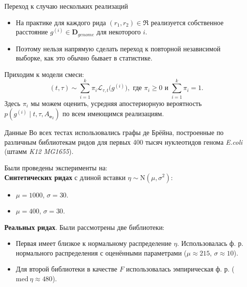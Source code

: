 \documentclass[unicode, notheorems]{beamer}
\begin{document}
\begin{frame}{Переход к случаю нескольких реализаций}
	\begin{itemize}
		\item На практике для каждого рида  $(r_1, r_2) \in \mathfrak{R}$ реализуется собственное расстояние $g^{(i)} \in \mathbf{D}_{genome}$ для некоторого $i$.
		\item Поэтому нельзя напрямую сделать переход к повторной независимой выборке, как это обычно бывает в статистике.
	\end{itemize}
	\medskip
	Приходим к {\color{blue} модели смеси}:
	\begin{equation*}
		(t, \tau) \sim \sum_{i=1}^k \pi_i  \mathcal{L}_{\tau, t} \big(g^{(i)}\big), \text{ где } \pi_i \ge 0 \text{ и } \sum_{i=1}^k \pi_i = 1.
	\end{equation*}
	Здесь $\pi_i$ мы можем оценить, усредняя апостериорную вероятность $p(g^{(i)} \mid t, \tau, A_{\mathbf{e}_2})$ по всем имеющимся реализациям.
\end{frame}

\begin{frame}{Данные}			
		Во всех тестах использовались графы де Брёйна, построенные по различным библиотекам ридов для первых 400 тысяч нуклеотидов генома \textit{E.coli} (штамм \textit{K12 MG1655}).
		\medskip
		
		Были проведены эксперименты на:\\
		\smallskip
		\textbf{Синтетических ридах} с длиной вставки $\eta \sim \mathrm{N}(\mu, \sigma^2)$:
		\begin{itemize}
			\item $\mu = 1000$, $\sigma = 30$.
			\item $\mu = 400$, $\sigma = 30$.
		\end{itemize}
		\textbf{Реальных ридах}. Были рассмотрены две библиотеки:
		\begin{itemize}
				\item Первая имеет близкое к нормальному распределение $\eta$. Использовалась ф. р. нормального распределения с оценёнными параметрами ($\mu \approx 215$, $\sigma \approx 10$).
				\item Для второй библиотеки в качестве $F$ использовалась эмпирическая ф. р. ($\mathrm{med}\ \eta \approx 480$).
		\end{itemize}
\end{frame}
\end{document}
